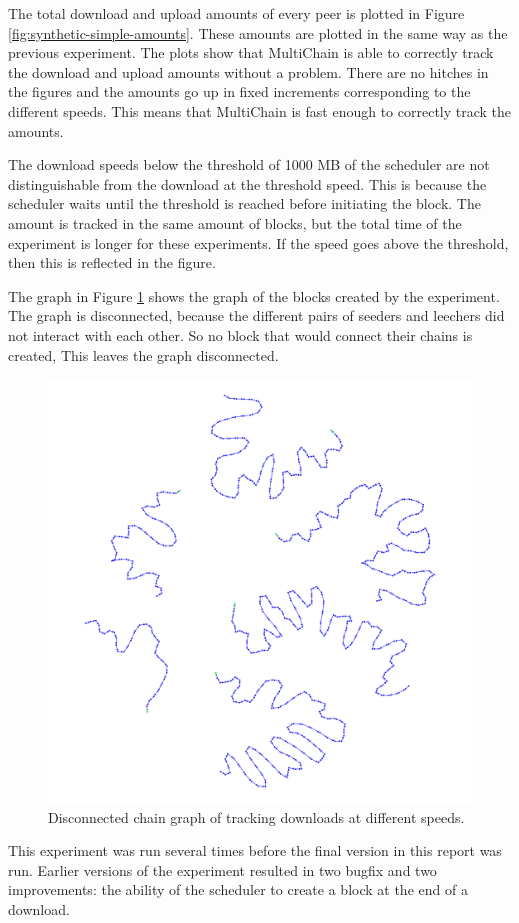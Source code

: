 The total download and upload amounts of every peer is plotted in Figure \ref{fig:synthetic-simple-amounts}.
These amounts are plotted in the same way as the previous experiment.
The plots show that MultiChain is able to correctly track the download and upload amounts without a problem.
There are no hitches in the figures and the amounts go up in fixed increments corresponding to the different speeds.
This means that MultiChain is fast enough to correctly track the amounts.

The download speeds below the threshold of 1000 MB of the scheduler
are not distinguishable from the download at the threshold speed.
This is because the scheduler waits until the threshold is reached before initiating the block.
The amount is tracked in the same amount of blocks,
but the total time of the experiment is longer for these experiments.
If the speed goes above the threshold, then this is reflected in the figure.

The graph in Figure \ref{fig:synthetic-simple-graph} shows the graph of the blocks created by the experiment.
The graph is disconnected, because the different pairs of seeders and leechers did not interact with each other.
So no block that would connect their chains is created,
This leaves the graph disconnected.

\begin{figure}
	\centerline{\includegraphics[scale=0.06]{experimentation/speeds/synthetic.png}}
	\caption{Disconnected chain graph of tracking downloads at different speeds.}
	\label{fig:synthetic-simple-graph}
\end{figure}

This experiment was run several times before the final version in this report was run.
Earlier versions of the experiment resulted in two bugfix and two improvements:
the ability of the scheduler to create a block at the end of a download.